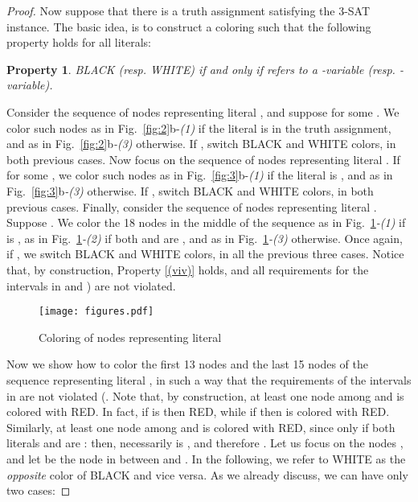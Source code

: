 \documentclass[a4paper,11pt]{article}
\theoremstyle{theorem}
\newtheorem{property}[theorem]{Property}
\begin{document}
\begin{proof}
\smallskip
Now suppose that there is a truth assignment satisfying the 3-SAT instance. The basic idea, is to construct a coloring  such that the following property holds for all literals: 



\begin{property}\label{(viv)}
 BLACK (resp. WHITE) if and only if  refers to a -variable (resp. -variable).
\end{property}

\smallskip
\noindent Consider the sequence of nodes representing literal , and suppose  for some . We color such nodes as in Fig.~\ref{fig:2}b-\emph{(1)} if the literal is  in the truth assignment, and as in Fig.~\ref{fig:2}b\emph{-(3)} otherwise. If , switch BLACK and WHITE colors, in both previous cases. Now focus on the sequence of nodes representing literal . If  for some , we color such nodes as in Fig.~\ref{fig:3}b-\emph{(1)} if the literal is , and as in Fig.~\ref{fig:3}b\emph{-(3)} otherwise. If , switch BLACK and WHITE colors, in both previous cases. Finally, consider the sequence of nodes representing literal . Suppose . We color the 18 nodes in the middle of the sequence as in Fig.~\ref{fig:8}\emph{-(1)} if  is , as in Fig.~\ref{fig:8}\emph{-(2)} if both  and  are , and as in Fig.~\ref{fig:8}\emph{-(3)}  otherwise. Once again, if , we switch BLACK and WHITE colors, in all the previous three cases. Notice that, 
by construction, Property \eqref{(viv)} holds, and all requirements for the intervals in   and ) are not violated. 




\begin{figure}[htb]
\centering
\texttt{[image: figures.pdf]} 
\caption{Coloring of nodes representing literal }
\label{fig:8}
\end{figure}



Now we show how to color the first 13 nodes  and the last 15 nodes  of the sequence representing literal , in such a way that the requirements of the intervals  in  are not violated (. Note that, by construction, at least one node among  and  is colored with RED. In fact, if  is  then  RED, while if  then  is colored with RED. Similarly, at least one node among  and  is colored with RED, since  only if both literals  and  are : then, necessarily  is , and therefore . 
Let us focus on the nodes , and let  be the node in between  and . In the following, we refer to WHITE as the \emph{opposite} color of BLACK and vice versa. 
As we already discuss, we can have only two cases:


\end{proof}
\end{document}
